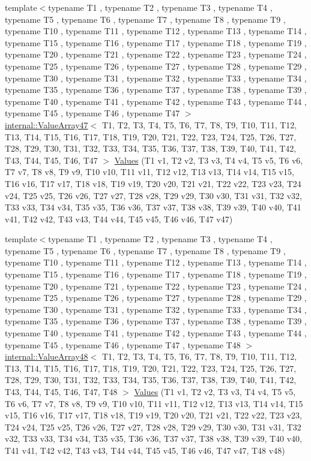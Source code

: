 \begin{DoxyCompactItemize}
\item 
{\footnotesize template$<$typename T1 , typename T2 , typename T3 , typename T4 , typename T5 , typename T6 , typename T7 , typename T8 , typename T9 , typename T10 , typename T11 , typename T12 , typename T13 , typename T14 , typename T15 , typename T16 , typename T17 , typename T18 , typename T19 , typename T20 , typename T21 , typename T22 , typename T23 , typename T24 , typename T25 , typename T26 , typename T27 , typename T28 , typename T29 , typename T30 , typename T31 , typename T32 , typename T33 , typename T34 , typename T35 , typename T36 , typename T37 , typename T38 , typename T39 , typename T40 , typename T41 , typename T42 , typename T43 , typename T44 , typename T45 , typename T46 , typename T47 $>$ }\\\mbox{\hyperlink{classtesting_1_1internal_1_1ValueArray47}{internal\+::\+Value\+Array47}}$<$ T1, T2, T3, T4, T5, T6, T7, T8, T9, T10, T11, T12, T13, T14, T15, T16, T17, T18, T19, T20, T21, T22, T23, T24, T25, T26, T27, T28, T29, T30, T31, T32, T33, T34, T35, T36, T37, T38, T39, T40, T41, T42, T43, T44, T45, T46, T47 $>$ \mbox{\hyperlink{namespacetesting_aba2697b2cd3e9d667ab3807022303240}{Values}} (T1 v1, T2 v2, T3 v3, T4 v4, T5 v5, T6 v6, T7 v7, T8 v8, T9 v9, T10 v10, T11 v11, T12 v12, T13 v13, T14 v14, T15 v15, T16 v16, T17 v17, T18 v18, T19 v19, T20 v20, T21 v21, T22 v22, T23 v23, T24 v24, T25 v25, T26 v26, T27 v27, T28 v28, T29 v29, T30 v30, T31 v31, T32 v32, T33 v33, T34 v34, T35 v35, T36 v36, T37 v37, T38 v38, T39 v39, T40 v40, T41 v41, T42 v42, T43 v43, T44 v44, T45 v45, T46 v46, T47 v47)
\item 
{\footnotesize template$<$typename T1 , typename T2 , typename T3 , typename T4 , typename T5 , typename T6 , typename T7 , typename T8 , typename T9 , typename T10 , typename T11 , typename T12 , typename T13 , typename T14 , typename T15 , typename T16 , typename T17 , typename T18 , typename T19 , typename T20 , typename T21 , typename T22 , typename T23 , typename T24 , typename T25 , typename T26 , typename T27 , typename T28 , typename T29 , typename T30 , typename T31 , typename T32 , typename T33 , typename T34 , typename T35 , typename T36 , typename T37 , typename T38 , typename T39 , typename T40 , typename T41 , typename T42 , typename T43 , typename T44 , typename T45 , typename T46 , typename T47 , typename T48 $>$ }\\\mbox{\hyperlink{classtesting_1_1internal_1_1ValueArray48}{internal\+::\+Value\+Array48}}$<$ T1, T2, T3, T4, T5, T6, T7, T8, T9, T10, T11, T12, T13, T14, T15, T16, T17, T18, T19, T20, T21, T22, T23, T24, T25, T26, T27, T28, T29, T30, T31, T32, T33, T34, T35, T36, T37, T38, T39, T40, T41, T42, T43, T44, T45, T46, T47, T48 $>$ \mbox{\hyperlink{namespacetesting_af3cdf373b137d357bb3a814c097bcd06}{Values}} (T1 v1, T2 v2, T3 v3, T4 v4, T5 v5, T6 v6, T7 v7, T8 v8, T9 v9, T10 v10, T11 v11, T12 v12, T13 v13, T14 v14, T15 v15, T16 v16, T17 v17, T18 v18, T19 v19, T20 v20, T21 v21, T22 v22, T23 v23, T24 v24, T25 v25, T26 v26, T27 v27, T28 v28, T29 v29, T30 v30, T31 v31, T32 v32, T33 v33, T34 v34, T35 v35, T36 v36, T37 v37, T38 v38, T39 v39, T40 v40, T41 v41, T42 v42, T43 v43, T44 v44, T45 v45, T46 v46, T47 v47, T48 v48)

\end{DoxyCompactItemize}
